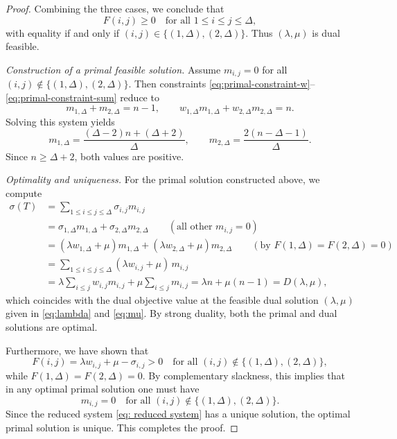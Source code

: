 \documentclass[preprint,12pt]{elsarticle}
\begin{document}
\begin{proof}
Combining the three cases, we conclude that
\[
F(i,j)\ge 0 \quad\text{for all }1\le i\le j\le \Delta,
\]
with equality if and only if $(i,j)\in\{(1,\Delta),(2,\Delta)\}$.
Thus $(\lambda,\mu)$ is dual feasible.

\medskip\noindent
\emph{Construction of a primal feasible solution.}
Assume $m_{i,j}=0$ for all $(i,j)\notin\{(1,\Delta),(2,\Delta)\}$.
Then constraints \eqref{eq:primal-constraint-w}--\eqref{eq:primal-constraint-sum}
reduce to
\begin{equation}
\label{eq: reduced system}
m_{1,\Delta}+m_{2,\Delta}=n-1,
\qquad
w_{1,\Delta}m_{1,\Delta}+w_{2,\Delta}m_{2,\Delta}=n.
\end{equation}
Solving this system yields
\[
m_{1,\Delta}=\frac{(\Delta-2)n+(\Delta+2)}{\Delta},
\qquad
m_{2,\Delta}=\frac{2(n-\Delta-1)}{\Delta}.
\]
Since $n\ge\Delta+2$, both values are positive.

\medskip\noindent
\emph{Optimality and uniqueness.}
For the primal solution constructed above, we compute
\begin{align*}
\sigma(T)
&=
\sum_{1\le i\le j\le \Delta} \sigma_{i,j} m_{i,j}\\
&=
\sigma_{1,\Delta}m_{1,\Delta}+\sigma_{2,\Delta}m_{2,\Delta}
\qquad(\text{all other }m_{i,j}=0)\\
&=
(\lambda w_{1,\Delta}+\mu)m_{1,\Delta}+(\lambda w_{2,\Delta}+\mu)m_{2,\Delta}
\qquad(\text{by }F(1,\Delta)=F(2,\Delta)=0)\\
&=
\sum_{1\le i\le j\le \Delta} (\lambda w_{i,j}+\mu)\, m_{i,j}\\
&=
\lambda\sum_{i\le j} w_{i,j} m_{i,j}
+
\mu\sum_{i\le j} m_{i,j}
=
\lambda n + \mu (n-1)
=
D(\lambda,\mu),
\end{align*}
which coincides with the dual objective value at the feasible dual solution
$(\lambda,\mu)$ given in \eqref{eq:lambda} and \eqref{eq:mu}.
By strong duality, both the primal and dual solutions are optimal.

Furthermore, we have shown that
\[
F(i,j)=\lambda w_{i,j}+\mu-\sigma_{i,j}>0
\quad\text{for all }(i,j)\notin\{(1,\Delta),(2,\Delta)\},
\]
while $F(1,\Delta)=F(2,\Delta)=0$.
By complementary slackness, this implies that in any optimal primal solution
one must have
\[
m_{i,j}=0
\quad\text{for all }(i,j)\notin\{(1,\Delta),(2,\Delta)\}.
\]
Since the reduced system \eqref{eq: reduced system}
has a unique solution, the optimal primal solution is unique.
This completes the proof.

\end{proof}
\end{document}
